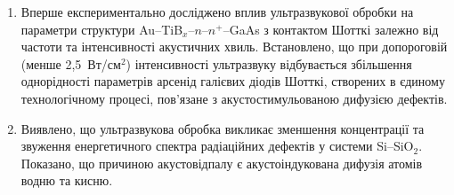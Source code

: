 \begin{enumerate}[leftmargin=0cm,itemindent=3em]
\item Вперше експериментально досліджено вплив ультразвукової обробки на параметри структури Au--TiB$_x$--$n$--$n^+$--GaAs з контактом Шотткі
 залежно від частоти та інтенсивності акустичних хвиль.
 Встановлено, що при допороговій (менше 2,5~Вт/см$^2$) інтенсивності ультразвуку відбувається збільшення однорідності параметрів арсенід галієвих діодів Шотткі, створених в єдиному технологічному процесі, пов'язане з
 акустостимульованою дифузією  дефектів.



\item Виявлено, що  ультразвукова обробка викликає зменшення концентрації та звуження енергетичного спектра радіаційних дефектів у системи   Si--SiO$_2$.
    Показано, що причиною акустовідпалу є акустоіндукована дифузія атомів водню та кисню.

\end{enumerate}

